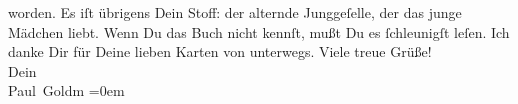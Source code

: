\begin{ledgroupsized}[t]{13cm}
               worden. {\pb}Es iſt übrigens Dein Stoff: der alternde
               Junggeſelle, der das junge Mädchen  liebt. Wenn
               Du das Buch nicht kennſt, mußt
               Du es ſchleunigſt leſen.\pend
           \pstart
           Ich danke Dir für Deine lieben Karten \strikeout{\textcolor{gray}{aus}} von unterwegs.\pend
           \pstart
           Viele treue Grüße!{\\[\baselineskip]}Dein{\\[\baselineskip]}\spacefill\mbox{Paul Goldm}\pend
           \leftskip=0em{}
         
         \endnumbering{}\end{ledgroupsized}\begin{anhang}\end{anhang}\newcommand{\dateiname}{L03213}\newcommand{\titel}{Paul Goldmann an Arthur Schnitzler, 14. 7. [1902]}\newcommand{\editorInnen}{Martin Anton Müller und Laura Untner}
      